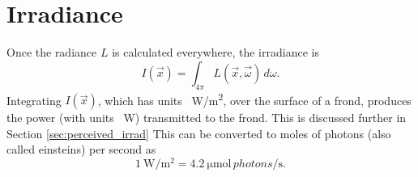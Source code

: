 \section{Irradiance}
Once the radiance $L$ is calculated everywhere, the irradiance is
\begin{equation}
  I(\vec{x}) = \int_{4\pi}L(\vec{x},\vec{\omega})\, d\omega.
\end{equation}
Integrating $I(\vec{x})$, which has units \SI{}{\W/m^2}, over the surface of a frond, produces the power (with units \SI{}{\W}) transmitted to the frond.
This is discussed further in Section \ref{sec:perceived_irrad}
This can be converted to moles of photons (also called einsteins) per second as
\begin{equation}
  \SI{1}{\W\per\m^2} = \SI{4.2}{\micro\mole \,photons\per\second}.
\end{equation}
